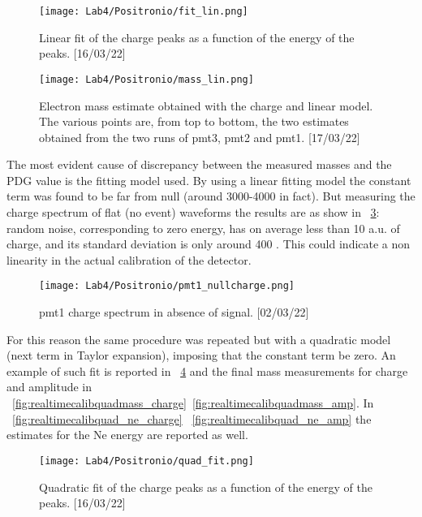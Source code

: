 \documentclass[10pt,a4paper,twocolumn]{article}
\begin{document}
\begin{figure}[h!]
\centering
\texttt{[image: Lab4/Positronio/fit\_lin.png]}
\caption{Linear fit of the charge peaks as a function of the energy of the peaks. [16/03/22]}
\label{fig:realtimecaliblinfit}
\end{figure}


\begin{figure}[h!]
\centering
\texttt{[image: Lab4/Positronio/mass\_lin.png]}
\caption{Electron mass estimate obtained with the charge and linear model. The various points are, from top to bottom, the two estimates obtained from the two runs of pmt3, pmt2 and pmt1. [17/03/22]}
\label{fig:realtimecaliblinmass}
\end{figure}



The most evident cause of discrepancy between the measured masses and the PDG value is the fitting model used. By using a linear fitting model the constant term was found to be far from null (around 3000-4000 in fact). But measuring the charge spectrum of flat (no event) waveforms the results are as show in \figurename~\ref{fig:nullcharge}: random noise, corresponding to zero energy, has on average less than 10 a.u. of charge, and its standard deviation is only around 400 . This could indicate a non linearity in the actual calibration of the detector. 

\begin{figure}[h!]
\centering
\texttt{[image: Lab4/Positronio/pmt1\_nullcharge.png]}
\caption{pmt1 charge spectrum in absence of signal. [02/03/22]}
\label{fig:nullcharge}
\end{figure}

For this reason the same procedure was repeated but with a quadratic model (next term in Taylor expansion), imposing that the constant term be zero. An example of such fit is reported in \figurename~\ref{fig:realtimecalibquadfit} and the final mass measurements for charge and amplitude in \figurename~\ref{fig:realtimecalibquadmass_charge}~\ref{fig:realtimecalibquadmass_amp}. In \figurename~\ref{fig:realtimecalibquad_ne_charge} ~\ref{fig:realtimecalibquad_ne_amp} the estimates for the Ne energy are reported as well.

\begin{figure}[h!]
\centering
\texttt{[image: Lab4/Positronio/quad\_fit.png]}
\caption{Quadratic fit of the charge peaks as a function of the energy of the peaks. [16/03/22]}
\label{fig:realtimecalibquadfit}
\end{figure}
\end{document}
